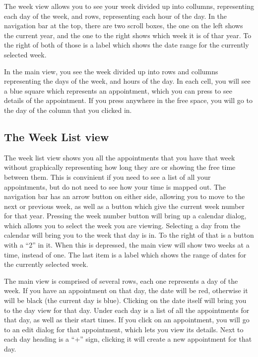 \documentclass[12pt,letterpaper,oneside, openany]{book} \usepackage[latin1] {inputenc}
\begin{document}
The week view allows you to see your week divided up into collumns, representing each day of the week, and rows, representing each hour of the day. In the navigation bar at the top, there are two scroll boxes, the one on the left shows the current year, and the one to the right shows which week it is of thar year. To the right of both of those is a label which shows the date range for the currently selected week. 

In the main view, you see the week divided up into rows and collumns representing the days of the week, and hours of the day. In each cell, you will see a blue square which represents an appointment, which you can press to see details of the appointment. If you press anywhere in the free space, you will go to the day of the column that you clicked in. 

\subsection{The Week List view}

The week list view shows you all the appointments that you have that week without graphically representing how long they are or showing the free time between them. This is convinient if you need to see a list of all your appointments, but do not need to see how your time is mapped out. The navigation bar has an arrow button on either side, allowing you to move to the next or previous week, as well as a button which give the current week number for that year. Pressing the week number button will bring up a calendar dialog, which allows you to select the week you are viewing. Selecting a day from the calendar will bring you to the week that day is in. To the right of that is a button with a ``2'' in it. When this is depressed, the main view will show two weeks at a time, instead of one. The last item is a label which shows the range of dates for the currently selected week. 

The main view is comprised of several rows, each one represents a day of the week. If you have an appointment on that day, the date will be red, otherwise it will be black (the current day is blue). Clicking on the date itself will bring you to the day view for that day. Under each day is a list of all the appointments for that day, as well as their start times. If you click on an appointment, you will go to an edit dialog for that appointment, which lets you view its details. Next to each day heading is a ``+'' sign, clicking it will create a new appointment for that day. 
\end{document}
